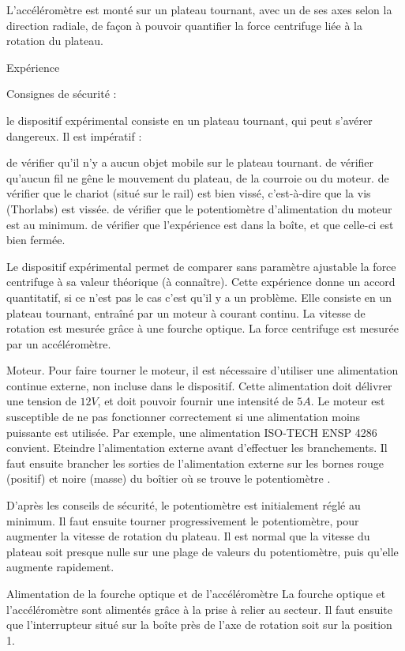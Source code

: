 \documentclass{article}%
\begin{document}
L'accéléromètre est monté sur un plateau tournant, avec un de ses axes selon la direction radiale, de façon à pouvoir quantifier la force centrifuge liée à la rotation du plateau. 

Expérience

Consignes de sécurité :

le dispositif expérimental consiste en un plateau tournant, qui peut s'avérer dangereux. Il est impératif :

    de vérifier qu'il n'y a aucun objet mobile sur le plateau tournant.
    de vérifier qu'aucun fil ne gêne le mouvement du plateau, de la courroie ou du moteur.
    de vérifier que le chariot (situé sur le rail) est bien vissé, c'est-à-dire que la vis (Thorlabs) est vissée.
    de vérifier que le potentiomètre d'alimentation du moteur est au minimum.
    de vérifier que l'expérience est dans la boîte, et que celle-ci est bien fermée.

Le dispositif expérimental permet de comparer sans paramètre ajustable la force centrifuge à sa valeur théorique (à connaître). Cette expérience donne un accord quantitatif, si ce n'est pas le cas c'est qu'il y a un problème. Elle consiste en un plateau tournant, entraîné par un moteur à courant continu. La vitesse de rotation est mesurée grâce à une fourche optique. La force centrifuge est mesurée par un accéléromètre.

Moteur. Pour faire tourner le moteur, il est nécessaire d'utiliser une alimentation continue externe, non incluse dans le dispositif. Cette alimentation doit délivrer une tension de $12 V$, et doit pouvoir fournir une intensité de $5 A$. Le moteur est susceptible de ne pas fonctionner correctement si une alimentation moins puissante est utilisée. Par exemple, une alimentation ISO-TECH ENSP 4286 convient. Eteindre l'alimentation externe avant d'effectuer les branchements. Il faut ensuite brancher les sorties de l'alimentation externe sur les bornes rouge (positif) et noire (masse) du boîtier où se trouve le potentiomètre .

D'après les conseils de sécurité, le potentiomètre est initialement réglé au minimum. Il faut ensuite tourner progressivement le potentiomètre, pour augmenter la vitesse de rotation du plateau. Il est normal que la vitesse du plateau soit presque nulle sur une plage de valeurs du potentiomètre, puis qu'elle augmente rapidement.

Alimentation de la fourche optique et de l'accéléromètre La fourche optique et l'accéléromètre sont alimentés grâce à la prise à relier au secteur. Il faut ensuite que l'interrupteur situé sur la boîte près de l'axe de rotation soit sur la position 1.
\end{document}
